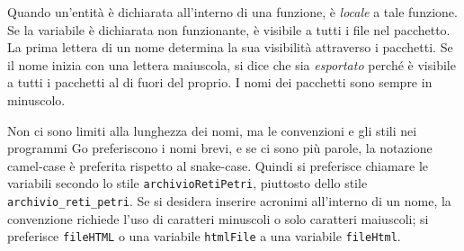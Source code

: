 Quando un'entità è dichiarata all'interno di una funzione, è \textit{locale} a tale funzione.
Se la variabile è dichiarata non funzionante, è visibile a tutti i file nel pacchetto.
La prima lettera di un nome determina la sua visibilità attraverso i pacchetti.
Se il nome inizia con una lettera maiuscola, si dice che sia \textit{esportato} perché è visibile a tutti i pacchetti al di fuori del proprio.
I nomi dei pacchetti sono sempre in minuscolo.

Non ci sono limiti alla lunghezza dei nomi, ma le convenzioni e gli stili nei programmi Go preferiscono i nomi brevi, e se ci sono più parole, la notazione camel-case è preferita rispetto al snake-case.
Quindi si preferisce chiamare le variabili secondo lo stile \verb|archivioRetiPetri|, piuttosto dello stile \verb|archivio_reti_petri|.
Se si desidera inserire acronimi all'interno di un nome, la convenzione richiede l'uso di caratteri minuscoli o solo caratteri maiuscoli;
si preferisce \verb|fileHTML| o una variabile \verb|htmlFile| a una variabile \verb|fileHtml|.

